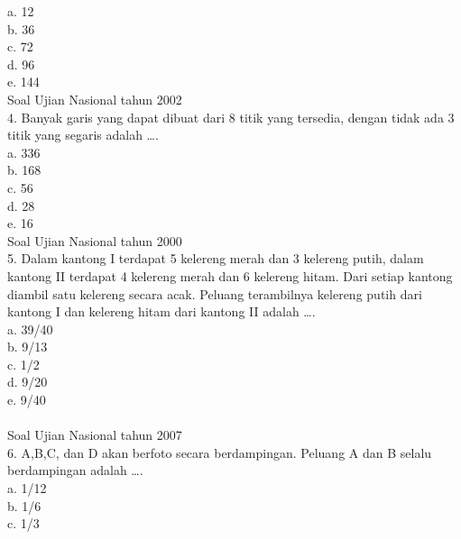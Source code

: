 \documentclass[11pt,fleqn]{book} %
\begin{document}
a. 12\\

b. 36\\

c. 72\\

d. 96\\

e. 144\\

Soal Ujian Nasional tahun 2002\\
4. Banyak garis yang dapat dibuat dari 8 titik yang tersedia, dengan tidak ada 3 titik yang segaris adalah ….\\

a. 336\\

b. 168\\

c. 56\\

d. 28\\

e. 16\\

Soal Ujian Nasional tahun 2000\\
5. Dalam kantong I terdapat 5 kelereng merah dan 3 kelereng putih, dalam kantong II terdapat 4 kelereng merah dan 6 kelereng hitam. Dari setiap kantong diambil satu kelereng secara acak. Peluang terambilnya kelereng putih dari kantong I dan kelereng hitam dari kantong II adalah ….\\

a. 39/40\\

b. 9/13\\

c. 1/2\\

d. 9/20\\

e. 9/40\\
\\

Soal Ujian Nasional tahun 2007\\
6. A,B,C, dan D akan berfoto secara berdampingan. Peluang A dan B selalu berdampingan adalah ….\\

a. 1/12\\

b. 1/6\\

c. 1/3\\
\end{document}

